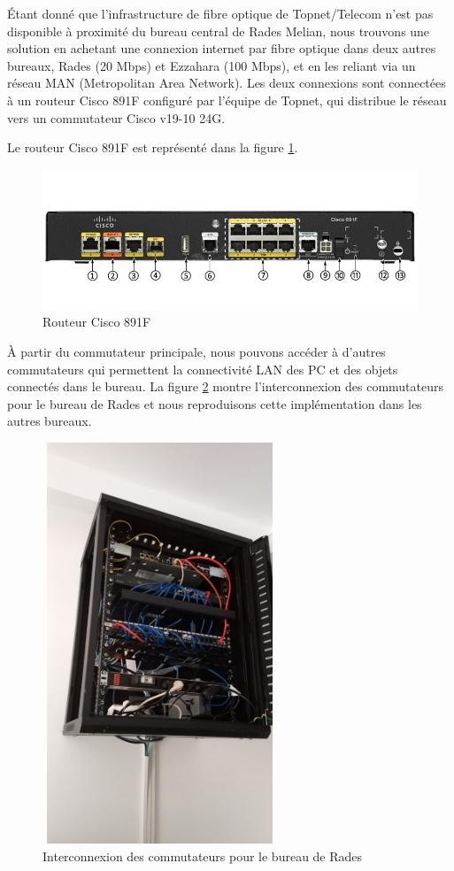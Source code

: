 Étant donné que l'infrastructure de fibre optique de Topnet/Telecom n'est pas disponible à proximité du bureau central de Rades Melian, nous trouvons une solution en achetant une connexion internet par fibre optique dans deux autres bureaux, Rades (20 Mbps) et Ezzahara (100 Mbps), et en les reliant via un réseau MAN (Metropolitan Area Network). Les deux connexions sont connectées à un routeur Cisco 891F configuré par l'équipe de Topnet, qui distribue le réseau vers un commutateur Cisco v19-10 24G. 


Le routeur Cisco 891F est représenté dans la figure \ref{Chap2.2.10}.

\begin{figure}[H]
\centering
\includegraphics[width=15cm]{Images/C891F_1.jpg}
\caption{Routeur Cisco 891F}
\label{Chap2.2.10}
\end{figure}

À partir du commutateur principale, nous pouvons accéder à d'autres commutateurs qui permettent la connectivité LAN des PC et des objets connectés dans le bureau. La figure \ref{Chap2.2.11} montre l'interconnexion des commutateurs pour le bureau de Rades et nous reproduisons cette implémentation dans les autres bureaux.

\begin{figure}[H]
\centering
\includegraphics[width=7cm,height=12cm]{Images/BRades-ArmoirePrincipal.jpg}
\caption{Interconnexion des commutateurs pour le bureau de Rades}
\label{Chap2.2.11}
\end{figure}



